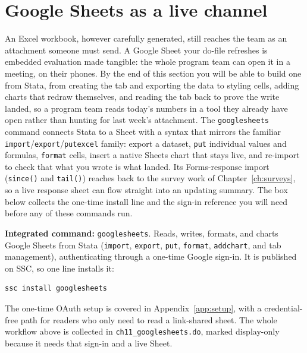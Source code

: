 \documentclass[
    a4paper,
    fontsize=10pt,
    twoside=true,
    numbers=noenddot,
]{kaobook}
\begin{document}
\section{Google Sheets as a live channel}\label{sec:googlesheets}
An Excel workbook, however carefully generated, still reaches the team as an attachment someone must send. A Google Sheet your do-file refreshes is embedded evaluation made tangible: the whole program team can open it in a meeting, on their phones. By the end of this section you will be able to build one from Stata, from creating the tab and exporting the data to styling cells, adding charts that redraw themselves, and reading the tab back to prove the write landed, so a program team reads today's numbers in a tool they already have open rather than hunting for last week's attachment. The \texttt{googlesheets} command connects Stata to a Sheet with a syntax that mirrors the familiar \texttt{import}/\texttt{export}/\texttt{putexcel} family: export a dataset, \texttt{put} individual values and formulas, \texttt{format} cells, insert a native Sheets chart that stays live, and re-import to check that what you wrote is what landed. Its Forms-response import (\texttt{since()} and \texttt{tail()}) reaches back to the survey work of Chapter~\ref{ch:surveys}, so a live response sheet can flow straight into an updating summary. The box below collects the one-time install line and the sign-in reference you will need before any of these commands run.

\begin{kaobox}[frametitle=Package Integration: \texttt{googlesheets}]
\textbf{Integrated command:} \texttt{googlesheets}. Reads, writes, formats, and charts Google Sheets from Stata (\texttt{import}, \texttt{export}, \texttt{put}, \texttt{format}, \texttt{addchart}, and tab management), authenticating through a one-time Google sign-in. It is published on SSC, so one line installs it:
\par
{\footnotesize
\begin{verbatim}
ssc install googlesheets
\end{verbatim}
}
The one-time OAuth setup is covered in Appendix~\ref{app:setup}, with a credential-free path for readers who only need to read a link-shared sheet. The whole workflow above is collected in \texttt{ch11\_googlesheets.do}, marked display-only because it needs that sign-in and a live Sheet.
\end{kaobox}
\end{document}
